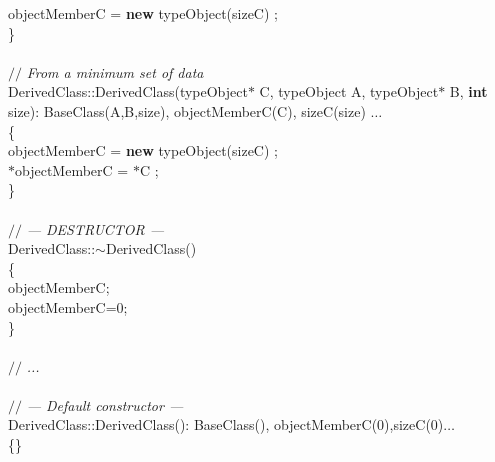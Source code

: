 \begin{flushleft}
\hspace*{2\indentation}objectMemberC = {\bf new} typeObject(sizeC) ;\mbox{}\\
\} \mbox{}\\
\hspace*{1\indentation}\mbox{}\\
{$//$\it{} From a minimum set of data{}\mbox{}\\
}DerivedClass::DerivedClass(typeObject$\ast$ C, typeObject A, typeObject$\ast$ B, {\bf int} size): BaseClass(A,B,size), objectMemberC(C), sizeC(size) $\ldots$\mbox{}\\
\{\mbox{}\\
\hspace*{2\indentation}objectMemberC = {\bf new} typeObject(sizeC) ;\mbox{}\\
\hspace*{2\indentation}$\ast$objectMemberC = $\ast$C ;\mbox{}\\
\}\mbox{}\\
\mbox{}\\
{$//$\it{} --- DESTRUCTOR --- {}\mbox{}\\
}DerivedClass::$\sim$DerivedClass()\mbox{}\\
\{\mbox{}\\
\hspace*{2\indentation}{\bf delete} objectMemberC;\mbox{}\\
\hspace*{2\indentation}objectMemberC=0;\mbox{}\\
\}\mbox{}\\
\mbox{}\\
{$//$\it{} ...{}\mbox{}\\
}\mbox{}\\
{$//$\it{} --- Default constructor ---{}\mbox{}\\
}DerivedClass::DerivedClass(): BaseClass(), objectMemberC(0),sizeC(0)$\ldots$\mbox{}\\
\{\}\mbox{}\\
\mbox{}\\
\end{flushleft}
